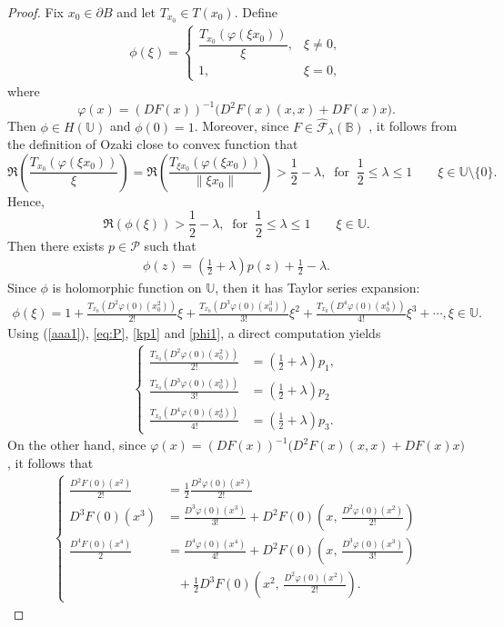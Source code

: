\documentclass[11pt, reqno]{amsart}
\numberwithin{equation}{section}
\newcommand{\bea}{\begin{eqnarray}}
\newcommand{\eea}{\end{eqnarray}}
\begin{document}
\begin{proof} Fix $x_0\in \partial B$ and let $T_{x_0}\in T(x_0)$. Define
\bea\label{aaa1}
\phi(\xi)=
\begin{cases}
\dfrac{T_{x_0}\!\left(\varphi(\xi x_0)\right)}{\xi}, & \xi\neq 0,\\[2mm]
1, & \xi=0,
\end{cases}
\eea
where
\[
\varphi(x)=(DF(x))^{-1}\bigl(D^2F(x)(x,x)+DF(x)x\bigl).
\]
Then $\phi\in H(\mathbb U)$ and $\phi(0)=1$. Moreover, since
$F\in \widehat{\mathcal{F}}_{\lambda}(\mathbb{B})$ , it follows from the definition of Ozaki close to convex function that
\[
\Re\!\left(\frac{T_{x_0}\!\left(\varphi(\xi x_0)\right)}{\xi}\right)
=
\Re\!\left(\frac{T_{\xi x_0}\!\left(\varphi(\xi x_0)\right)}{\|\xi x_0\|}\right)>\frac{1}{2}-\lambda,\;\;\text{for}\;\;\frac{1}{2}\leq \lambda \leq 1
\qquad \xi\in\mathbb U\setminus\{0\}.
\]
Hence,
\[\Re\!\left(\phi(\xi)\right)>\frac{1}{2}-\lambda,\;\;\text{for}\;\;\frac{1}{2}\leq \lambda \leq 1\qquad \xi\in\mathbb U.
\]
 Then there exists $p\in \mathcal{P}$ such that 
\bea\label{kp1}\phi(z)=\left(\frac{1}{2}+\lambda\right) p(z)+\frac{1}{2}-\lambda.\eea
Since $\phi$ is holomorphic function on $\mathbb{U}$, then it has Taylor series expansion:
\bea\label{phi1}\phi(\xi)=1+\frac{T_{x_0}(D^2\varphi(0)(x_0^2))}{2!}\xi+\frac{T_{x_0}(D^3\varphi(0)(x_0^3))}{3!}\xi^2+\frac{T_{x_0}(D^4\varphi(0)(x_0^4))}{4!}\xi^3+\cdots,\xi\in \mathbb{U}.\eea
Using (\ref{aaa1}), \eqref{eq:P}, \eqref{kp1} and \eqref{phi1}, a direct computation yields
\bea\label{qq1}
\begin{cases} \frac{T_{x_0}(D^2\varphi(0)(x_0^2))}{2!}&=\left(\frac{1}{2}+\lambda\right)p_1,\\
 \frac{T_{x_0}(D^3\varphi(0)(x_0^3))}{3!}&=\left(\frac{1}{2}+\lambda\right)p_2\\
\frac{T_{x_0}(D^4\varphi(0)(x_0^4))}{4!}&=\left(\frac{1}{2}+\lambda\right)p_3.
\end{cases}
\eea
On the other hand, since $\varphi(x)=(DF(x))^{-1}\bigl(D^2F(x)(x,x)+DF(x)x\bigl)$, it follows that
\bea\label{qqq2}
\begin{cases}
\frac{D^{2}F(0)(x^{2})}{2!}&=\frac{1}{2}\frac{D^{2}\varphi(0)(x^{2})}{2!}\\
 D^{3}F(0)(x^{3})&=\frac{D^{3}\varphi(0)(x^{3})}{3!}+D^{2}F(0)\!\left(x,\,\frac{D^{2}\varphi(0)(x^{2})}{2!}\right)\\
\frac{D^{4}F(0)(x^{4})}{2}&=\frac{D^{4}\varphi(0)(x^{4})}{4!}+D^{2}F(0)\!\left(x,\,\frac{D^{3}\varphi(0)(x^{3})}{3!}\right)\\
&\;\;\;+\frac{1}{2}D^{3}F(0)\!\left(x^{2},\,\frac{D^{2}\varphi(0)(x^{2})}{2!}\right).
\end{cases}\eea


\end{proof}
\end{document}
